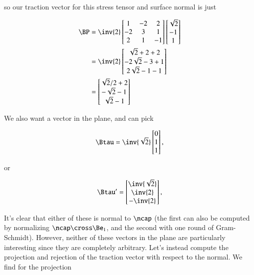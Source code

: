so our traction vector for this stress tensor and surface normal is just

\begin{align*}
\BP &=
\inv{2}
\begin{bmatrix}
1 & -2 & 2 \\
-2 & 3 & 1 \\
2 & 1 & -1
\end{bmatrix}
\begin{bmatrix}
\sqrt{2} \\
-1 \\
1
\end{bmatrix} \\
&=
\inv{2}
\begin{bmatrix}
\sqrt{2} + 2 + 2 \\
-2\sqrt{2} - 3 + 1 \\
2\sqrt{2} - 1 -1
\end{bmatrix} \\
&=
\begin{bmatrix}
\sqrt{2}/2 + 2 \\
-\sqrt{2} -1 \\
\sqrt{2} - 1
\end{bmatrix}
\end{align*}

We also want a vector in the plane, and can pick

\begin{equation}\label{eqn:continuumProblemSet1:450}
\Btau = 
\inv{\sqrt{2}}
\begin{bmatrix}
0 \\
1 \\
1
\end{bmatrix},
\end{equation}

or

\begin{equation}\label{eqn:continuumProblemSet1:470}
\Btau' = 
\begin{bmatrix}
\inv{\sqrt{2}} \\
\inv{2} \\
-\inv{2}
\end{bmatrix},
\end{equation}

It's clear that either of these is normal to $\ncap$ (the first can also be computed by normalizing $\ncap \cross \Be_1$, and the second with one round of Gram-Schmidt).  However, neither of these vectors in the plane are particularly interesting since they are completely arbitrary.  Let's instead compute the projection and rejection of the traction vector with respect to the normal.  We find for the projection

